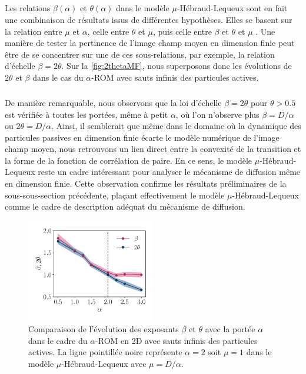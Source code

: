 \subparagraph{}Les relations $\beta(\alpha)$ et $\theta(\alpha)$ dans le modèle $\mu$-Hébraud-Lequeux sont en fait une combinaison de résultats issus de différentes hypothèses. Elles se basent sur la relation entre $\mu$ et $\alpha$, celle entre $\theta$ et $\mu$, puis celle entre $\beta$ et $\theta$ et $\mu$ \cite{lin_microscopic_2018}. Une manière de tester la pertinence de l'image champ moyen en dimension finie peut être de se concentrer sur une de ces sous-relations, par exemple, la relation d'échelle $\beta = 2\theta$. Sur la \autoref{fig:2thetaMF}, nous superposons donc les évolutions de $2\theta$ et $\beta$ dans le cas du $\alpha$-ROM avec sauts infinis des particules actives. 

\subparagraph{}De manière remarquable, nous observons que la loi d'échelle $\beta = 2\theta$ pour $\theta > 0.5$ est vérifiée à toutes les portées, même à petit $\alpha$, où l'on n'observe plus $\beta=D/\alpha$ ou $2\theta=D/\alpha$. Ainsi, il semblerait que même dans le domaine où la dynamique des particules passives en dimension finie écarte le modèle numérique de l'image champ moyen, nous retrouvons un lien direct entre la convexité de la transition et la forme de la fonction de corrélation de paire. En ce sens, le modèle $\mu$-Hébraud-Lequeux reste un cadre intéressant pour analyser le mécanisme de diffusion même en dimension finie. Cette observation confirme les résultats préliminaires de la sous-sous-section précédente, plaçant effectivement le modèle $\mu$-Hébraud-Lequeux comme le cadre de description adéquat du mécanisme de diffusion.

\begin{figure}[h]
	\centering
	\includegraphics[width=0.5\textwidth]{Chapitre3/Figures/Interpretation/beta_theta_alphaMF.pdf}
	\caption{Comparaison de l'évolution des exposants $\beta$ et $\theta$ avec la portée $\alpha$ dans le cadre du $\alpha$-ROM en 2D avec sauts infinis des particules actives. La ligne pointillée noire représente $\alpha = 2$ soit $\mu=1$ dans le modèle $\mu$-Hébraud-Lequeux avec $\mu=D/\alpha$.}
	\label{fig:2thetaMF}
\end{figure}


